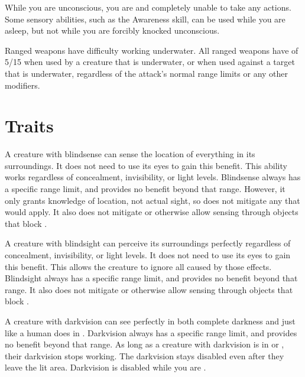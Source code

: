      While you are unconscious, you are \helpless and completely unable to take any actions.
    Some sensory abilities, such as the Awareness skill, can be used while you are asleep, but not while you are forcibly knocked unconscious.

     Ranged weapons have difficulty working underwater.
    All ranged weapons have  of 5/15 when used by a creature that is underwater, or when used against a target that is underwater, regardless of the attack's normal range limits or any other modifiers.

\newpage
\section{Traits}\label{Traits}

        A creature with blindsense can sense the location of everything in its surroundings.
        It does not need to use its eyes to gain this benefit.
        This ability works regardless of concealment, invisibility, or light levels.
        Blindsense always has a specific range limit, and provides no benefit beyond that range.
        However, it only grants knowledge of location, not actual sight, so does not mitigate any  that would apply.
        It also does not mitigate  or otherwise allow sensing through objects that block .

        A creature with blindsight can perceive its surroundings perfectly regardless of concealment, invisibility, or light levels.
        It does not need to use its eyes to gain this benefit.
        This allows the creature to ignore all  caused by those effects.
        Blindsight always has a specific range limit, and provides no benefit beyond that range.
        It also does not mitigate  or otherwise allow sensing through objects that block .

        A creature with darkvision can see perfectly in both complete darkness and  just like a human does in .
        Darkvision always has a specific range limit, and provides no benefit beyond that range.
        As long as a creature with darkvision is in  or , their darkvision stops working.
        The darkvision  stays disabled even after they leave the lit area.
        Darkvision is disabled while you are \dazzled.


